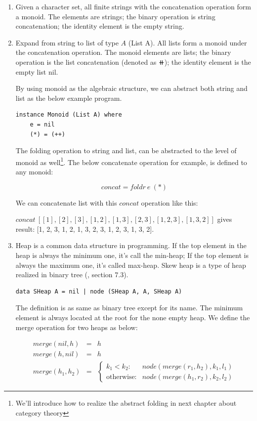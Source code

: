\documentclass[b5paper]{article}
\begin{document}
\begin{enumerate}
\item Given a character set, all finite strings with the concatenation operation form a monoid. The elements are strings; the binary operation is string concatenation; the identity element is the empty string.
\item Expand from string to list of type $A$ (List A). All lists form a monoid under the concatenation operation. The monoid elements are lists; the binary operation is the list concatenation (denoted as $\doubleplus$); the identity element is the empty list nil.

By using monoid as the algebraic structure, we can abstract both string and list as the below example program.

\begin{lstlisting}
instance Monoid (List A) where
    e = nil
    (*) = (++)
\end{lstlisting}

The folding operation to string and list, can be abstracted to the level of monoid as well\footnote{We'll introduce how to realize the abstract folding in next chapter about category theory}. The below concatenate operation for example, is defined to any monoid:

\[
concat = foldr\ e\ (*)
\]

We can concatenate list with this $concat$ operation like this:

$concat\ [[1], [2], [3], [1, 2], [1, 3], [2, 3], [1, 2, 3], [1, 3, 2]]$ gives result: [1, 2, 3, 1, 2, 1, 3, 2, 3, 1, 2, 3, 1, 3, 2].

\item Heap is a common data structure in programming. If the top element in the heap is always the minimum one, it's call the min-heap; If the top element is always the maximum one, it's called max-heap. Skew heap is a type of heap realized in binary tree (\cite{LiuXinyu2017}, section 7.3).

\begin{lstlisting}
data SHeap A = nil | node (SHeap A, A, SHeap A)
\end{lstlisting}

The definition is as same as binary tree except for its name. The minimum element is always located at the root for the none empty heap. We define the merge operation for two heaps as below:

\[
\begin{array}{rcl}
merge(nil, h) & = & h \\
merge(h, nil) & = & h \\
merge(h_1, h_2) & = &
  \begin{cases}
  k_1 < k_2 : & node(merge(r_1, h_2), k_1, l_1) \\
  \text{otherwise}: & node(merge(h_1, r_2), k_2, l_2)
  \end{cases}
\end{array}
\]


\end{enumerate}
\end{document}
